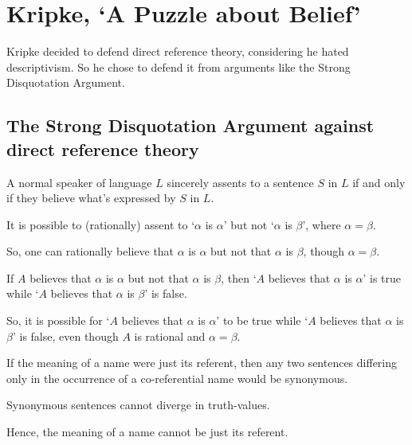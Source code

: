 \chapter{Kripke, `A Puzzle about Belief'}

Kripke decided to defend direct reference theory, considering he hated descriptivism. So he chose to defend it from arguments like the Strong Disquotation Argument.

\section{The Strong Disquotation Argument against direct reference theory}

\begin{definition}
A normal speaker of language $L$ sincerely assents to a sentence $S$ in $L$ if and only if they believe what's expressed by $S$ in $L$.
\end{definition}

\begin{argument}\leavevmode
\begin{premises}
  \item[(P1)] It is possible to (rationally) assent to `$\alpha$ is $\alpha$' but not `$\alpha$ is $\beta$', where $\alpha = \beta$.
  \item[(C1)] So, one can rationally believe that $\alpha$ is $\alpha$ but not that $\alpha$ is $\beta$, though $\alpha = \beta$.
  \item[(P2)] If $A$ believes that $\alpha$ is $\alpha$ but not that $\alpha$ is $\beta$, then `$A$ believes that $\alpha$ is $\alpha$' is true while `$A$ believes that $\alpha$ is $\beta$' is false.
  \item[(C2)] So, it is possible for `$A$ believes that $\alpha$ is $\alpha$' to be true while `$A$ believes that $\alpha$ is $\beta$' is false, even though $A$ is rational and $\alpha = \beta$.
  \item[(P3)] If the meaning of a name were just its referent, then any two sentences differing only in the occurrence of a co-referential name would be synonymous.
  \item[(P4)] Synonymous sentences cannot diverge in truth-values.
  \item[(C3)] Hence, the meaning of a name cannot be just its referent.
\end{premises}
\end{argument}

